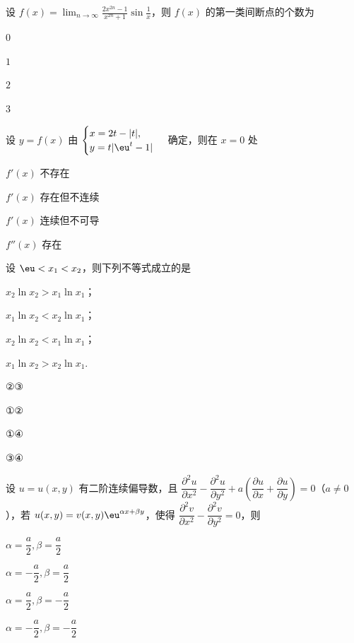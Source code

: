 
\begin{question}[index=1]
设 $\displaystyle f(x)=\lim_{n\to\infty}\frac{2x^{2n}-1}{x^{2n}+1}\sin\frac1x$，则 $f(x)$ 的第一类间断点的个数为
\begin{choices}[columns=4]
\item $0$
\item $1$
\item $2$
\item $3$
\end{choices}
\end{question}
\QuestionBreak

\begin{question}[index=2]
设 $y=f(x)$ 由 $\begin{cases}x=2t-|t|,\\y=t|\eu^t-1|\end{cases}$ 确定，则在 $x=0$ 处
\begin{choices}[columns=2]
\item $f'(x)$ 不存在
\item $f'(x)$ 存在但不连续
\item $f'(x)$ 连续但不可导
\item $f''(x)$ 存在
\end{choices}
\end{question}
\QuestionBreak

\begin{question}[index=3]
设 $\eu<x_1<x_2$，则下列不等式成立的是
\par{} $x_2\ln x_2>x_1\ln x_1$；
\par{} $x_1\ln x_2<x_2\ln x_1$；
\par{} $x_2\ln x_2<x_1\ln x_1$；
\par{} $x_1\ln x_2>x_2\ln x_1$.
\begin{choices}[columns=4]
\item ②③
\item ①②
\item ①④
\item ③④
\end{choices}
\end{question}
\QuestionBreak

\begin{question}[index=4]
设 $u=u(x,y)$ 有二阶连续偏导数，且 $\dfrac{\partial^2u}{\partial x^2}-\dfrac{\partial^2u}{\partial y^2}+a\left(\dfrac{\partial u}{\partial x}+\dfrac{\partial u}{\partial y}\right)=0$（$a\ne0$），若 $u(x,y)=v(x,y)\eu^{\alpha x+\beta y}$，使得 $\dfrac{\partial^2v}{\partial x^2}-\dfrac{\partial^2v}{\partial y^2}=0$，则
\begin{choices}[columns=2]
\item $\alpha=\dfrac a2,\beta=\dfrac a2$
\item $\alpha=-\dfrac a2,\beta=\dfrac a2$
\item $\alpha=\dfrac a2,\beta=-\dfrac a2$
\item $\alpha=-\dfrac a2,\beta=-\dfrac a2$
\end{choices}
\end{question}
\QuestionBreak

